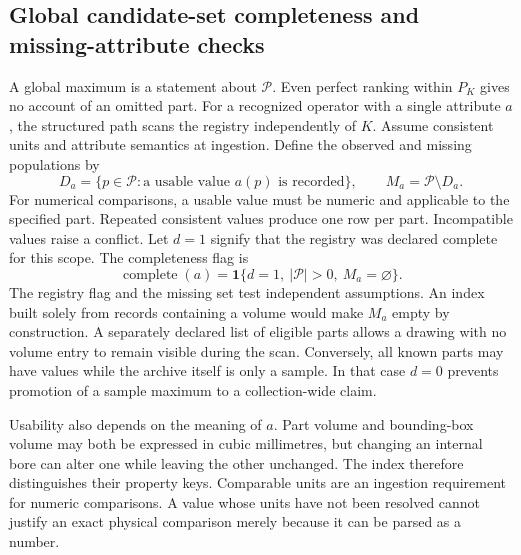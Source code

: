 \subsection{Global candidate-set completeness and missing-attribute checks}
\label{sec:method-scope}
A global maximum is a statement about $\mathcal P$. Even perfect ranking within $P_K$ gives no account of an omitted part. For a recognized operator with a single attribute $a$, the structured path scans the registry independently of $K$. Assume consistent units and attribute semantics at ingestion. Define the observed and missing populations by
\begin{equation}
 D_a=\{p\in\mathcal P:\text{a usable value }a(p)\text{ is recorded}\},
 \qquad M_a=\mathcal P\setminus D_a .
\end{equation}
For numerical comparisons, a usable value must be numeric and applicable to the specified part. Repeated consistent values produce one row per part. Incompatible values raise a conflict. Let $d=1$ signify that the registry was declared complete for this scope. The completeness flag is
\begin{equation}
 \operatorname{complete}(a)=
 \mathbf1\{d=1,\ |\mathcal P|>0,\ M_a=\varnothing\}.
 \label{eq:method-complete}
\end{equation}
The registry flag and the missing set test independent assumptions. An index built solely from records containing a volume would make $M_a$ empty by construction. A separately declared list of eligible parts allows a drawing with no volume entry to remain visible during the scan. Conversely, all known parts may have values while the archive itself is only a sample. In that case $d=0$ prevents promotion of a sample maximum to a collection-wide claim.

Usability also depends on the meaning of $a$. Part volume and bounding-box volume may both be expressed in cubic millimetres, but changing an internal bore can alter one while leaving the other unchanged. The index therefore distinguishes their property keys. Comparable units are an ingestion requirement for numeric comparisons. A value whose units have not been resolved cannot justify an exact physical comparison merely because it can be parsed as a number.

